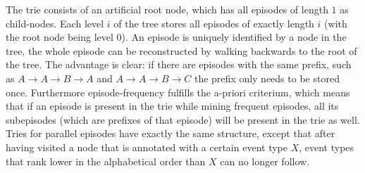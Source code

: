 The trie consists of an artificial root node, which has all episodes of length $1$ as child-nodes. Each level $i$ of the tree stores all episodes of exactly length $i$ (with the root node being level $0$). An episode is uniquely identified by a node in the tree, the whole episode can be reconstructed by walking backwards to the root of the tree. The advantage is clear: if there are episodes with the same prefix, such as $A \rightarrow A \rightarrow B \rightarrow A$ and $A \rightarrow A \rightarrow B \rightarrow C$ the prefix only needs to be stored once. Furthermore episode-frequency fulfills the a-priori criterium, which means that if an episode is present in the trie while mining frequent episodes, all its subepisodes (which are prefixes of that episode) will be present in the trie as well. Tries for parallel episodes have exactly the same structure, except that after having visited a node that is annotated with a certain event type $X$, event types that rank lower in the alphabetical order than $X$ can no longer follow.
